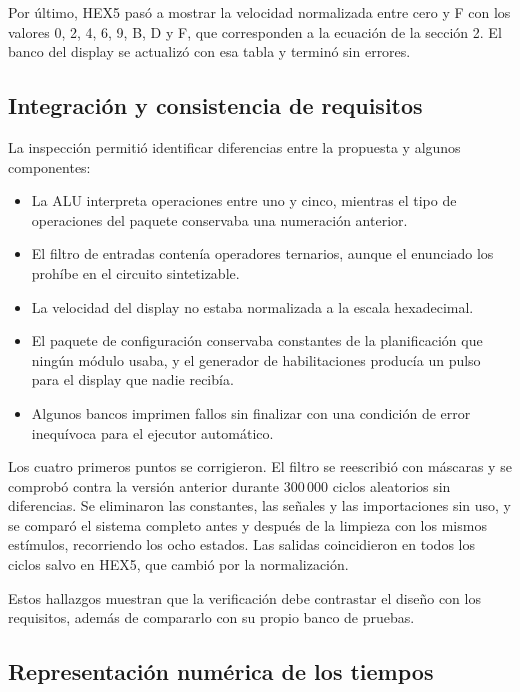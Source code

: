 \documentclass[12pt,letterpaper]{article}
\begin{document}
Por último, HEX5 pasó a mostrar la velocidad normalizada
entre cero y F con los valores 0, 2, 4, 6, 9, B, D y F,
que corresponden a la ecuación de la sección 2. El banco
del display se actualizó con esa tabla y terminó sin
errores.

\subsection{Integración y consistencia de requisitos}

La inspección permitió identificar diferencias entre
la propuesta y algunos componentes:

\begin{itemize}
    \item La ALU interpreta operaciones entre uno y cinco,
    mientras el tipo de operaciones del paquete conservaba
    una numeración anterior.
    \item El filtro de entradas contenía operadores
    ternarios, aunque el enunciado los prohíbe en el
    circuito sintetizable.
    \item La velocidad del display no estaba normalizada
    a la escala hexadecimal.
    \item El paquete de configuración conservaba constantes
    de la planificación que ningún módulo usaba, y el
    generador de habilitaciones producía un pulso para el
    display que nadie recibía.
    \item Algunos bancos imprimen fallos sin finalizar
    con una condición de error inequívoca para el
    ejecutor automático.
\end{itemize}

Los cuatro primeros puntos se corrigieron. El filtro se
reescribió con máscaras y se comprobó contra la versión
anterior durante 300\,000 ciclos aleatorios sin
diferencias. Se eliminaron las constantes, las señales y
las importaciones sin uso, y se comparó el sistema
completo antes y después de la limpieza con los mismos
estímulos, recorriendo los ocho estados. Las salidas
coincidieron en todos los ciclos salvo en HEX5, que
cambió por la normalización.

Estos hallazgos muestran que la verificación debe
contrastar el diseño con los requisitos, además de
compararlo con su propio banco de pruebas.

\subsection{Representación numérica de los tiempos}
\end{document}

